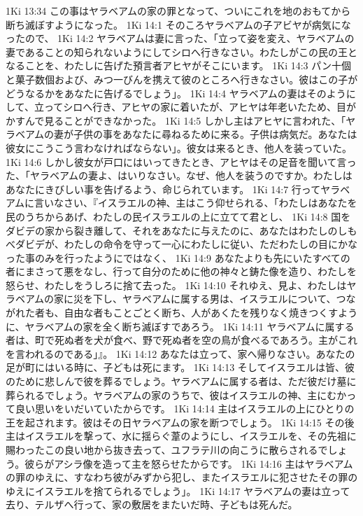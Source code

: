 1Ki 13:34  この事はヤラベアムの家の罪となって、ついにこれを地のおもてから断ち滅ぼすようになった。
1Ki 14:1  そのころヤラベアムの子アビヤが病気になったので、
1Ki 14:2  ヤラベアムは妻に言った、「立って姿を変え、ヤラベアムの妻であることの知られないようにしてシロへ行きなさい。わたしがこの民の王となることを、わたしに告げた預言者アヒヤがそこにいます。
1Ki 14:3  パン十個と菓子数個および、みつ一びんを携えて彼のところへ行きなさい。彼はこの子がどうなるかをあなたに告げるでしょう」。
1Ki 14:4  ヤラベアムの妻はそのようにして、立ってシロへ行き、アヒヤの家に着いたが、アヒヤは年老いたため、目がかすんで見ることができなかった。
1Ki 14:5  しかし主はアヒヤに言われた、「ヤラベアムの妻が子供の事をあなたに尋ねるために来る。子供は病気だ。あなたは彼女にこうこう言わなければならない」。彼女は来るとき、他人を装っていた。
1Ki 14:6  しかし彼女が戸口にはいってきたとき、アヒヤはその足音を聞いて言った、「ヤラベアムの妻よ、はいりなさい。なぜ、他人を装うのですか。わたしはあなたにきびしい事を告げるよう、命じられています。
1Ki 14:7  行ってヤラベアムに言いなさい、『イスラエルの神、主はこう仰せられる、「わたしはあなたを民のうちからあげ、わたしの民イスラエルの上に立てて君とし、
1Ki 14:8  国をダビデの家から裂き離して、それをあなたに与えたのに、あなたはわたしのしもべダビデが、わたしの命令を守って一心にわたしに従い、ただわたしの目にかなった事のみを行ったようにではなく、
1Ki 14:9  あなたよりも先にいたすべての者にまさって悪をなし、行って自分のために他の神々と鋳た像を造り、わたしを怒らせ、わたしをうしろに捨て去った。
1Ki 14:10  それゆえ、見よ、わたしはヤラベアムの家に災を下し、ヤラベアムに属する男は、イスラエルについて、つながれた者も、自由な者もことごとく断ち、人があくたを残りなく焼きつくすように、ヤラベアムの家を全く断ち滅ぼすであろう。
1Ki 14:11  ヤラベアムに属する者は、町で死ぬ者を犬が食べ、野で死ぬ者を空の鳥が食べるであろう。主がこれを言われるのである」』。
1Ki 14:12  あなたは立って、家へ帰りなさい。あなたの足が町にはいる時に、子どもは死にます。
1Ki 14:13  そしてイスラエルは皆、彼のために悲しんで彼を葬るでしょう。ヤラベアムに属する者は、ただ彼だけ墓に葬られるでしょう。ヤラベアムの家のうちで、彼はイスラエルの神、主にむかって良い思いをいだいていたからです。
1Ki 14:14  主はイスラエルの上にひとりの王を起されます。彼はその日ヤラベアムの家を断つでしょう。
1Ki 14:15  その後主はイスラエルを撃って、水に揺らぐ葦のようにし、イスラエルを、その先祖に賜わったこの良い地から抜き去って、ユフラテ川の向こうに散らされるでしょう。彼らがアシラ像を造って主を怒らせたからです。
1Ki 14:16  主はヤラベアムの罪のゆえに、すなわち彼がみずから犯し、またイスラエルに犯させたその罪のゆえにイスラエルを捨てられるでしょう」。
1Ki 14:17  ヤラベアムの妻は立って去り、テルザへ行って、家の敷居をまたいだ時、子どもは死んだ。
